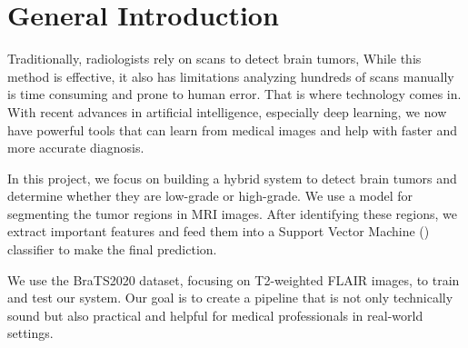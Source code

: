 \chapter*{General Introduction}

Traditionally, radiologists rely on  scans to detect brain tumors, While this method is effective, it also has limitations analyzing hundreds of scans manually is time consuming and prone to human error. That is where technology comes in. With recent advances in artificial intelligence, especially deep learning, we now have powerful tools that can learn from medical images and help with faster and more accurate diagnosis.

In this project, we focus on building a hybrid system to detect brain tumors and determine whether they are low-grade or high-grade. We use a  model for segmenting the tumor regions in MRI images. After identifying these regions, we extract important features and feed them into a Support Vector Machine () classifier to make the final prediction.

We use the BraTS2020 dataset, focusing on T2-weighted FLAIR images, to train and test our system. Our goal is to create a pipeline that is not only technically sound but also practical and helpful for medical professionals in real-world settings.

